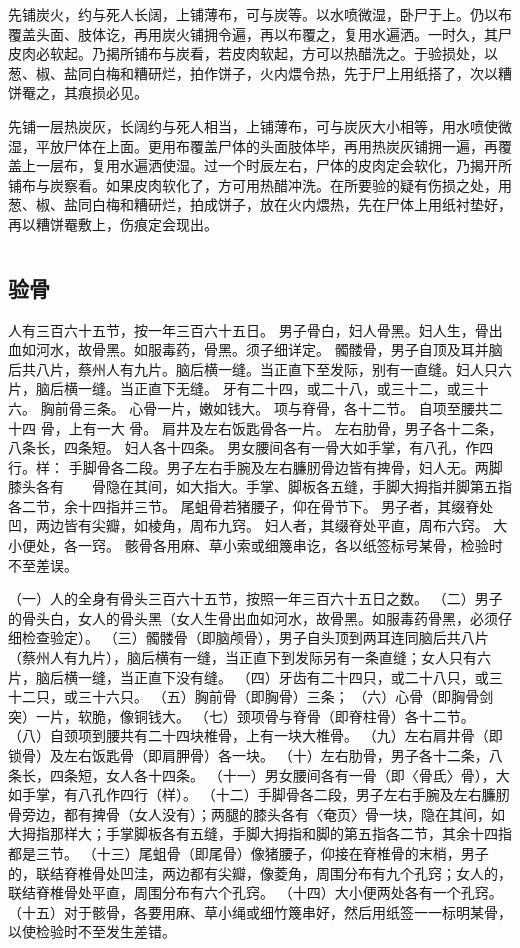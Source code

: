 \documentclass[12pt,UTF8]{ctexbook}
\begin{document}
先铺炭火，约与死人长阔，上铺薄布，可与炭等。以水喷微湿，卧尸于上。仍以布覆盖头面、肢体讫，再用炭火铺拥令遍，再以布覆之，复用水遍洒。一时久，其尸皮肉必软起。乃揭所铺布与炭看，若皮肉软起，方可以热醋洗之。于验损处，以葱、椒、盐同白梅和糟研烂，拍作饼子，火内煨令热，先于尸上用纸搭了，次以糟饼罨之，其痕损必见。


先铺一层热炭灰，长阔约与死人相当，上铺薄布，可与炭灰大小相等，用水喷使微湿，平放尸体在上面。更用布覆盖尸体的头面肢体毕，再用热炭灰铺拥一遍，再覆盖上一层布，复用水遍洒使湿。过一个时辰左右，尸体的皮肉定会软化，乃揭开所铺布与炭察看。如果皮肉软化了，方可用热醋冲洗。在所要验的疑有伤损之处，用葱、椒、盐同白梅和糟研烂，拍成饼子，放在火内煨热，先在尸体上用纸衬垫好，再以糟饼罨敷上，伤痕定会现出。


\part{}

\chapter{验骨}

人有三百六十五节，按一年三百六十五日。
男子骨白，妇人骨黑。妇人生，骨出血如河水，故骨黑。如服毒药，骨黑。须子细详定。
髑髅骨，男子自顶及耳并脑后共八片，蔡州人有九片。脑后横一缝。当正直下至发际，别有一直缝。妇人只六片，脑后横一缝。当正直下无缝。
牙有二十四，或二十八，或三十二，或三十六。
胸前骨三条。
心骨一片，嫩如钱大。
项与脊骨，各十二节。
自项至腰共二十四 骨，上有一大 骨。
肩井及左右饭匙骨各一片。
左右肋骨，男子各十二条，八条长，四条短。
妇人各十四条。
男女腰间各有一骨大如手掌，有八孔，作四行。样：
手脚骨各二段。男子左右手腕及左右臁肕骨边皆有捭骨，妇人无。两脚膝头各有　　骨隐在其间，如大指大。手掌、脚板各五缝，手脚大拇指并脚第五指各二节，余十四指并三节。
尾蛆骨若猪腰子，仰在骨节下。
男子者，其缀脊处凹，两边皆有尖瓣，如棱角，周布九窍。
妇人者，其缀脊处平直，周布六窍。
大小便处，各一窍。
骸骨各用麻、草小索或细篾串讫，各以纸签标号某骨，检验时不至差误。


（一）人的全身有骨头三百六十五节，按照一年三百六十五日之数。
（二）男子的骨头白，女人的骨头黑（女人生骨出血如河水，故骨黑。如服毒药骨黑，必须仔细检查验定）。
（三）髑髅骨（即脑颅骨），男子自头顶到两耳连同脑后共八片（蔡州人有九片），脑后横有一缝，当正直下到发际另有一条直缝；女人只有六片，脑后横一缝，当正直下没有缝。
（四）牙齿有二十四只，或二十八只，或三十二只，或三十六只。
（五）胸前骨（即胸骨）三条；
（六）心骨（即胸骨剑突）一片，软脆，像铜钱大。
（七）颈项骨与脊骨（即脊柱骨）各十二节。
（八）自颈项到腰共有二十四块椎骨，上有一块大椎骨。
（九）左右肩井骨（即锁骨）及左右饭匙骨（即肩胛骨）各一块。
（十）左右肋骨，男子各十二条，八条长，四条短，女人各十四条。
（十一）男女腰间各有一骨（即〈骨氐〉骨），大如手掌，有八孔作四行（样）。
（十二）手脚骨各二段，男子左右手腕及左右臁肕骨旁边，都有捭骨（女人没有）；两腿的膝头各有〈奄页〉骨一块，隐在其间，如大拇指那样大；手掌脚板各有五缝，手脚大拇指和脚的第五指各二节，其余十四指都是三节。
（十三）尾蛆骨（即尾骨）像猪腰子，仰接在脊椎骨的末梢，男子的，联结脊椎骨处凹洼，两边都有尖瓣，像菱角，周围分布有九个孔窍；女人的，联结脊椎骨处平直，周围分布有六个孔窍。
（十四）大小便两处各有一个孔窍。
（十五）对于骸骨，各要用麻、草小绳或细竹篾串好，然后用纸签一一标明某骨，以使检验时不至发生差错。
\end{document}
